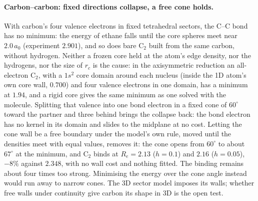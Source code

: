 \documentclass[11pt]{article}
\begin{document}
\paragraph{Carbon--carbon: fixed directions collapse, a free cone holds.} With carbon's four valence
electrons in fixed tetrahedral sectors, the C--C bond has no minimum: the energy of ethane falls until the core
spheres meet near $2.0\,a_0$ (experiment $2.901$), and so does bare C$_2$ built from the same carbon, without
hydrogen. Neither a frozen core held at the atom's edge density, nor the hydrogens, nor the size of $r_c$ is the
cause: in the axisymmetric reduction an all-electron C$_2$, with a $1s^2$ core domain around each nucleus (inside
the 1D atom's own core wall, $0.700$) and four valence electrons in one domain, has a minimum at $1.94$, and a
rigid core gives the same minimum as one solved with the molecule. Splitting that valence into one bond electron
in a fixed cone of $60^\circ$ toward the partner and three behind brings the collapse back: the bond electron has
no kernel in its domain and slides to the midplane at no cost. Letting the cone wall be a free boundary under
the model's own rule, moved until the densities meet with equal values, removes it: the cone opens from
$60^\circ$ to about $67^\circ$ at the minimum, and C$_2$ binds at $R_e = 2.13$ ($h = 0.1$) and $2.16$
($h = 0.05$), $-8\%$ against $2.348$, with no wall cost and nothing fitted. The binding remains about four times
too strong. Minimising the energy over the cone angle instead would run away to narrow cones. The 3D sector
model imposes its walls; whether free walls under continuity give carbon its shape in 3D is the open test.
\end{document}
